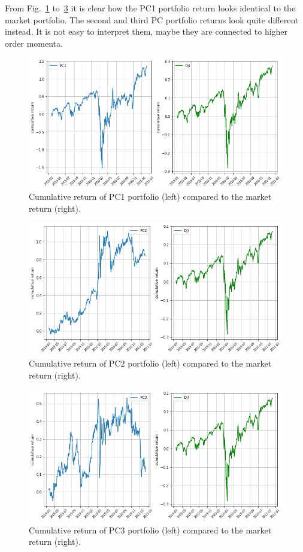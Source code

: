 From Fig.~\ref{fig:ret_pc1} to~\ref{fig:ret_pc3} it is clear
how the PC1 portfolio return looks identical to the market
portfolio. The second and third PC portfolio returns look quite
different instead. It is not easy to interpret them, maybe they are
connected to higher order momenta. 

\begin{figure}[htb]
	\centering
	\includegraphics[width=.7\textwidth]{figures/cum_ret_pc1_vs_market}
	\caption{Cumulative return of PC1 portfolio (left) compared to the market return (right).}
	\label{fig:ret_pc1}
\end{figure}

\begin{figure}[htb]
	\centering
	\includegraphics[width=.7\textwidth]{figures/cum_ret_pc2_vs_market}
	\caption{Cumulative return of PC2 portfolio (left) compared to the market return (right).}
	\label{fig:ret_pc2}
\end{figure}

\begin{figure}[htb]
	\centering
	\includegraphics[width=.7\textwidth]{figures/cum_ret_pc3_vs_market}
	\caption{Cumulative return of PC3 portfolio (left) compared to the market return (right).}
	\label{fig:ret_pc3}
\end{figure}

